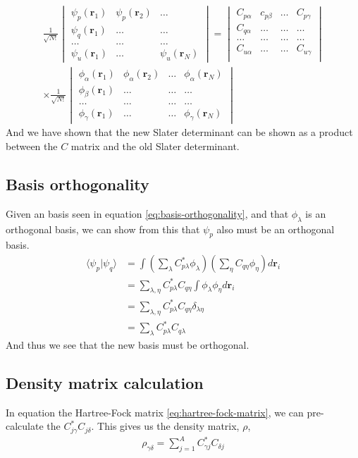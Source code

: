 \documentclass[11pt]{article}
\begin{document}
\begin{align*}
	\frac{1}{\sqrt{N!}}
	\begin{vmatrix}
		\psi_p(\mathbf{r}_1) & \psi_p(\mathbf{r}_2) & \dots \\
		\psi_q(\mathbf{r}_1) & \dots 				& \dots	\\
		\dots 				 & \dots 				& \dots \\
		\psi_u(\mathbf{r}_1) & \dots 				& \psi_u(\mathbf{r}_N)
	\end{vmatrix} = 
	\begin{vmatrix}
		C_{p\alpha} & c_{p\beta} 	& \dots 	& C_{p\gamma} \\
		C_{q\alpha} & \dots 		& \dots 	& \dots \\
		\dots 		& \dots			& \dots		& \dots \\
		C_{u\alpha} & \dots 		& \dots 	& C_{u\gamma} \\
	\end{vmatrix} \\
	\times 
	\frac{1}{\sqrt{N!}}
	\begin{vmatrix}
		\phi_\alpha(\mathbf{r}_1) & \phi_\alpha(\mathbf{r}_2) & \dots & \phi_\alpha(\mathbf{r}_N) \\
		\phi_\beta(\mathbf{r}_1) & \dots & \dots & \dots \\
		\dots & \dots & \dots & \dots \\
		\phi_\gamma(\mathbf{r}_1) & \dots & \dots & \phi_\gamma(\mathbf{r}_N)
	\end{vmatrix}
\end{align*}
And we have shown that the new Slater determinant can be shown as a product between the $C$ matrix and the old Slater determinant.

\subsection{Basis orthogonality}
Given an basis seen in equation \eqref{eq:basis-orthogonality}, and that $\phi_\lambda$ is an orthogonal basis, we can show from this that $\psi_p$ also must be an orthogonal basis.
\begin{align*}
	\langle \psi_p | \psi_q \rangle &= \int \left( \sum_\lambda C^*_{p\lambda}\phi_\lambda \right) \left( \sum_\eta C_{q\eta}\phi_\eta \right) d\mathbf{r}_i \\
	&= \sum_{\lambda,\eta} C^*_{p\lambda} C_{q\eta} \int \phi_\lambda \phi_\eta d\mathbf{r}_i \\
	&= \sum_{\lambda,\eta} C^*_{p\lambda} C_{q\eta} \delta_{\lambda\eta} \\
	&= \sum_{\lambda} C^*_{p\lambda} C_{q\lambda}
\end{align*}
And thus we see that the new basis must be orthogonal.

\subsection{Density matrix calculation}
In equation the Hartree-Fock matrix \eqref{eq:hartree-fock-matrix}, we can pre-calculate the $C_{j\gamma}^* C_{j\delta}$. This gives us the density matrix, $\rho$,
\begin{align}
	\rho_{\gamma\delta} = \sum_{j=1}^A C_{\gamma j}^* C_{\delta j}
	\label{eq:rho-matrix}
\end{align}
\end{document}
